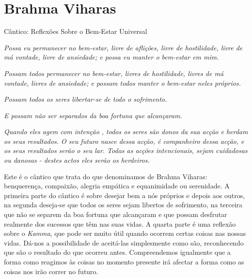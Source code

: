 \chapter{Brahma Viharas}


Cântico: Reflexões Sobre o Bem-Estar Universal

\emph{Possa eu permanecer no bem-estar, livre de aflições, livre de
hostilidade, livre de má vontade, livre de ansiedade; e possa eu manter
o bem-estar em mim.}

\emph{Possam todos permanecer no bem-estar, livres de hostilidade,
livres de má vontade, livres de ansiedade; e possam todos manter o
bem-estar neles próprios.}

\emph{Possam todos os seres libertar-se de todo o sofrimento.}

\emph{E possam não ser separados da boa fortuna que alcançaram. }

\emph{Quando eles agem com intenção , todos os seres são donos da sua
acção e herdam os seus resultados. O seu futuro nasce dessa acção, é
companheiro dessa acção, e os seus resultados serão o seu lar. Todas as
acções intencionais, sejam cuidadosas ou danosas - destes actos eles
serão os herdeiros.}

Este é o cântico que trata do que denominamos de Brahma Viharas:
benquerença, compaixão, alegria empática e equanimidade ou serenidade. A
primeira parte do cântico é sobre desejar bem a nós próprios e depois
aos outros, na segunda deseja-se que todos os seres sejam libertos de
sofrimento, na terceira que não se separem da boa fortuna que alcançaram
e que possam desfrutar realmente dos sucessos que têm nas suas vidas. A
quarta parte é uma reflexão sobre o \emph{Kamma}, que pode ser muito
útil quando ocorrem certas coisas nas nossas vidas. Dá-nos a
possibilidade de aceitá-las simplesmente como são, reconhecendo que são
o resultado do que ocorreu antes. Compreendemos igualmente que a forma
como reagimos às coisas no momento presente irá afectar a forma como as
coisas nos irão correr no futuro.

